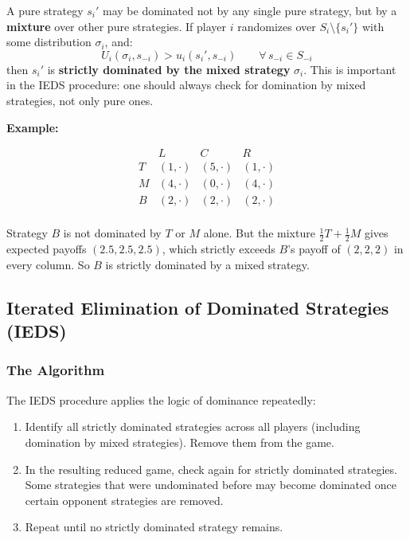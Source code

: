 \documentclass[hidelinks]{article}
\begin{document}
A pure strategy $s_i'$ may be dominated not by any single pure strategy, but by a \textbf{mixture} over other pure strategies. If player $i$ randomizes over $S_i \setminus \{s_i'\}$ with some distribution $\sigma_i$, and:
\[
U_i(\sigma_i, s_{-i}) > u_i(s_i', s_{-i}) \qquad \forall\, s_{-i} \in S_{-i}
\]
then $s_i'$ is \textbf{strictly dominated by the mixed strategy} $\sigma_i$. This is important in the IEDS procedure: one should always check for domination by mixed strategies, not only pure ones.

\textbf{Example:}

\[
\begin{array}{c|ccc}
 & L & C & R \\
\hline
T & (1,\cdot) & (5,\cdot) & (1,\cdot) \\
M & (4,\cdot) & (0,\cdot) & (4,\cdot) \\
B & (2,\cdot) & (2,\cdot) & (2,\cdot) \\
\end{array}
\]

Strategy $B$ is not dominated by $T$ or $M$ alone. But the mixture $\frac{1}{2}T + \frac{1}{2}M$ gives expected payoffs $(2.5, 2.5, 2.5)$, which strictly exceeds $B$'s payoff of $(2,2,2)$ in every column. So $B$ is strictly dominated by a mixed strategy.

\subsection{Iterated Elimination of Dominated Strategies (IEDS)}

\subsubsection{The Algorithm}

The IEDS procedure applies the logic of dominance repeatedly:

\begin{enumerate}
    \item Identify all strictly dominated strategies across all players (including domination by mixed strategies). Remove them from the game.
    \item In the resulting reduced game, check again for strictly dominated strategies. Some strategies that were undominated before may become dominated once certain opponent strategies are removed.
    \item Repeat until no strictly dominated strategy remains.
\end{enumerate}
\end{document}
